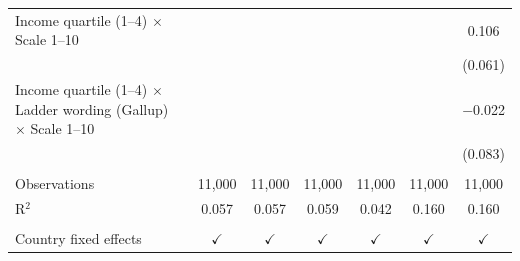 \begin{tabular}{lcccccc}
   Income quartile (1--4) $\times$ Scale 1--10                                    &                &                &                &                &                & 0.106\\   
                                                                                  &                &                &                &                &                & (0.061)\\   
   Income quartile (1--4) $\times$ Ladder wording (Gallup) $\times$ Scale 1--10   &                &                &                &                &                & $-$0.022\\   
                                                                                  &                &                &                &                &                & (0.083)\\   
    \\
   Observations                                                                   & 11,000         & 11,000         & 11,000         & 11,000         & 11,000         & 11,000\\  
   R$^2$                                                                          & 0.057          & 0.057          & 0.059          & 0.042          & 0.160          & 0.160\\  
    \\
   Country fixed effects                                                          & $\checkmark$   & $\checkmark$   & $\checkmark$   & $\checkmark$   & $\checkmark$   & $\checkmark$\\   
   \bottomrule
\end{tabular}
\par\endgroup


